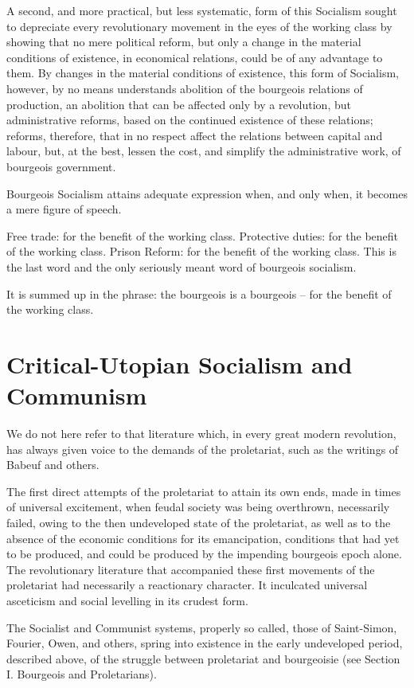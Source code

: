 A second, and more practical, but less systematic, form of this Socialism sought to depreciate every revolutionary movement in the eyes of the working class by showing that no mere political reform, but only a change in the material conditions of existence, in economical relations, could be of any advantage to them. By changes in the material conditions of existence, this form of Socialism, however, by no means understands abolition of the bourgeois relations of production, an abolition that can be affected only by a revolution, but administrative reforms, based on the continued existence of these relations; reforms, therefore, that in no respect affect the relations between capital and labour, but, at the best, lessen the cost, and simplify the administrative work, of bourgeois government. 

Bourgeois Socialism attains adequate expression when, and only when, it becomes a mere figure of speech. 

Free trade: for the benefit of the working class. Protective duties: for the benefit of the working class. Prison Reform: for the benefit of the working class. This is the last word and the only seriously meant word of bourgeois socialism. 

It is summed up in the phrase: the bourgeois is a bourgeois – for the benefit of the working class. 

\section{Critical-Utopian Socialism and Communism}

We do not here refer to that literature which, in every great modern revolution, has always given voice to the demands of the proletariat, such as the writings of Babeuf and others. 

The first direct attempts of the proletariat to attain its own ends, made in times of universal excitement, when feudal society was being overthrown, necessarily failed, owing to the then undeveloped state of the proletariat, as well as to the absence of the economic conditions for its emancipation, conditions that had yet to be produced, and could be produced by the impending bourgeois epoch alone. The revolutionary literature that accompanied these first movements of the proletariat had necessarily a reactionary character. It inculcated universal asceticism and social levelling in its crudest form. 

The Socialist and Communist systems, properly so called, those of Saint-Simon, Fourier, Owen, and others, spring into existence in the early undeveloped period, described above, of the struggle between proletariat and bourgeoisie (see Section I. Bourgeois and Proletarians). 

